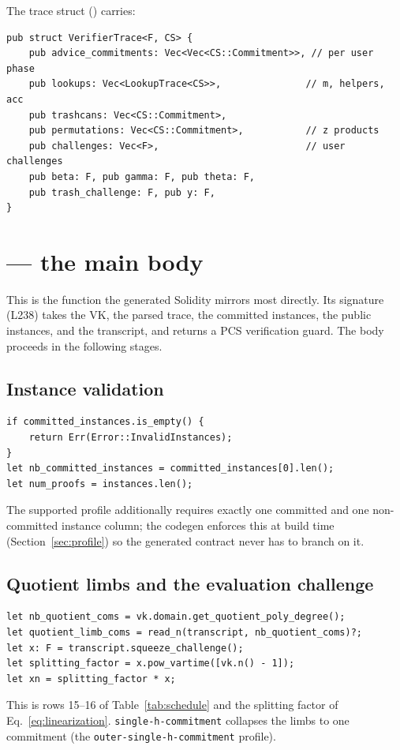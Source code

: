 The trace struct () carries:
\begin{lstlisting}[style=rust]
pub struct VerifierTrace<F, CS> {
    pub advice_commitments: Vec<Vec<CS::Commitment>>, // per user phase
    pub lookups: Vec<LookupTrace<CS>>,               // m, helpers, acc
    pub trashcans: Vec<CS::Commitment>,
    pub permutations: Vec<CS::Commitment>,           // z products
    pub challenges: Vec<F>,                          // user challenges
    pub beta: F, pub gamma: F, pub theta: F,
    pub trash_challenge: F, pub y: F,
}
\end{lstlisting}

\section{ --- the main body}
\label{sec:verify-alg}

This is the function the generated Solidity mirrors most directly. Its
signature (L238) takes the VK, the parsed trace, the committed instances,
the public instances, and the transcript, and returns a PCS verification
guard. The body proceeds in the following stages.

\subsection{Instance validation}
\begin{lstlisting}[style=rust]
if committed_instances.is_empty() {
    return Err(Error::InvalidInstances);
}
let nb_committed_instances = committed_instances[0].len();
let num_proofs = instances.len();
\end{lstlisting}
The supported profile additionally requires exactly one committed and one
non-committed instance column; the codegen enforces this at build time
(Section~\ref{sec:profile}) so the generated contract never has to branch
on it.

\subsection{Quotient limbs and the evaluation challenge}
\begin{lstlisting}[style=rust]
let nb_quotient_coms = vk.domain.get_quotient_poly_degree();
let quotient_limb_coms = read_n(transcript, nb_quotient_coms)?;
let x: F = transcript.squeeze_challenge();
let splitting_factor = x.pow_vartime([vk.n() - 1]);
let xn = splitting_factor * x;
\end{lstlisting}
This is rows 15--16 of Table~\ref{tab:schedule} and the splitting factor
of Eq.~\eqref{eq:linearization}. \texttt{single-h-commitment} collapses
the limbs to one commitment (the \texttt{outer-single-h-commitment}
profile).


